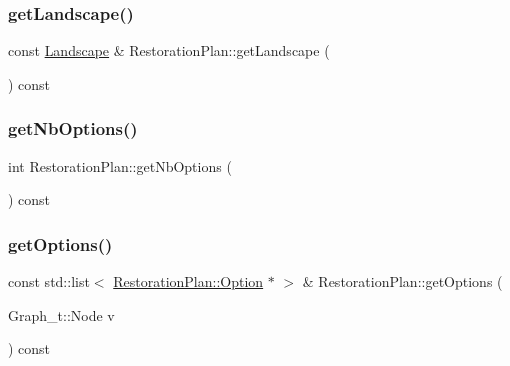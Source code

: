 \subsubsection{\texorpdfstring{get\+Landscape()}{getLandscape()}}
{\footnotesize\ttfamily const \hyperlink{class_landscape}{Landscape} \& Restoration\+Plan\+::get\+Landscape (\begin{DoxyParamCaption}{ }\end{DoxyParamCaption}) const}

\mbox{\label{class_restoration_plan_a7c4e4b567a22267fb6a1c7eb8617c0fa}} 
\subsubsection{\texorpdfstring{get\+Nb\+Options()}{getNbOptions()}}
{\footnotesize\ttfamily int Restoration\+Plan\+::get\+Nb\+Options (\begin{DoxyParamCaption}{ }\end{DoxyParamCaption}) const}

\mbox{\label{class_restoration_plan_a0c27b60675feb66f08f142d2d090ea7a}} 
\subsubsection{\texorpdfstring{get\+Options()}{getOptions()}\hspace{0.1cm}{\footnotesize\ttfamily [1/2]}}
{\footnotesize\ttfamily const std\+::list$<$ \hyperlink{class_restoration_plan_1_1_option}{Restoration\+Plan\+::\+Option} $\ast$ $>$ \& Restoration\+Plan\+::get\+Options (\begin{DoxyParamCaption}\item[{Graph\+\_\+t\+::\+Node}]{v }\end{DoxyParamCaption}) const}

\mbox{\label{class_restoration_plan_afd0c1f1d3c4a8d951a72500bfe9fa31a}} 
